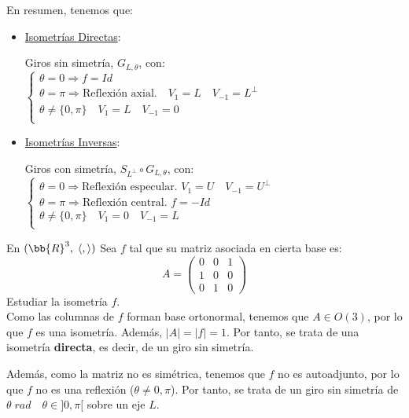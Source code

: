 En resumen, tenemos que:
\begin{itemize}
    \item \underline{Isometrías Directas}:
    
    Giros sin simetría, $G_{L,\theta}$, con: $\left\{\begin{array}{l}
        \theta = 0 \Longrightarrow f=Id \\
        \theta = \pi \Longrightarrow \text{Reflexión axial.} \quad V_1=L\quad V_{-1}=L^{\perp} \\
        \theta \neq\{0,\pi\} \quad V_1=L\quad V_{-1}=0 \\
    \end{array}\right.$

    \item \underline{Isometrías Inversas}:

    Giros con simetría, $S_{L^\perp}\circ G_{L,\theta}$, con: $\left\{\begin{array}{l}
        \theta = 0 \Longrightarrow \text{Reflexión especular. } V_1 = U \quad V_{-1} = U^\perp\\
        \theta = \pi \Longrightarrow \text{Reflexión central. } f=-Id \\
        \theta \neq\{0,\pi\} \quad V_1=0\quad V_{-1}=L \\
    \end{array}\right.$
\end{itemize}

\begin{ejercicio}
    En $(\bb{R}^3,\;\langle,\rangle)$ Sea $f$ tal que su matriz asociada en cierta base es:
    \begin{equation*}
        A = \left(\begin{array}{ccc}
            0 & 0 & 1 \\
            1 & 0 & 0 \\
            0 & 1 & 0
        \end{array}\right)
    \end{equation*}
    Estudiar la isometría $f$.\\

    Como las columnas de $f$ forman base ortonormal, tenemos que $A\in O(3)$, por lo que $f$ es una isometría. Además, $|A|=|f|=1$. Por tanto, se trata de una isometría \textbf{directa}, es decir, de un giro sin simetría.

    Además, como la matriz no es simétrica, tenemos que $f$ no es autoadjunto, por lo que $f$ no es una reflexión ($\theta \neq 0,\pi$). Por tanto, se trata de un giro sin simetría de $\theta \;rad \quad \theta \in ]0,\pi[$ sobre un eje $L$.
\end{ejercicio}


